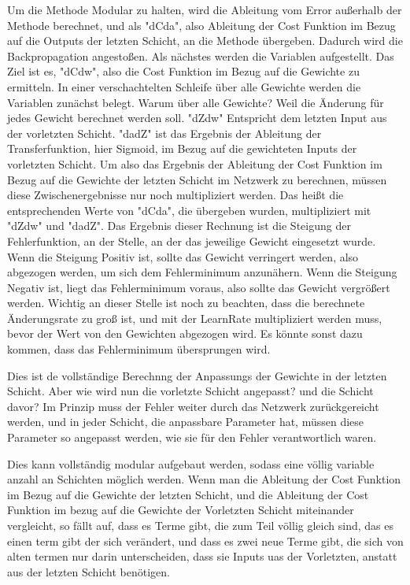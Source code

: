 \documentclass[12pt]{article}
\begin{document}
Um die Methode Modular zu halten, wird die Ableitung vom Error außerhalb der Methode berechnet, und als "dCda", also Ableitung der Cost Funktion im Bezug auf die Outputs der letzten Schicht, an die Methode übergeben. Dadurch wird die Backpropagation angestoßen. Als nächstes werden die Variablen aufgestellt. Das Ziel ist es, "dCdw", also die Cost Funktion im Bezug auf die Gewichte zu ermitteln. 
In einer verschachtelten Schleife über alle Gewichte werden die Variablen zunächst belegt.
Warum über alle Gewichte? Weil die Änderung für jedes Gewicht berechnet werden soll. 
"dZdw" Entspricht dem letzten Input aus der vorletzten Schicht. "dadZ" ist das Ergebnis der Ableitung der Transferfunktion, hier Sigmoid, im Bezug auf die gewichteten Inputs der vorletzten Schicht.
Um also das Ergebnis der Ableitung der Cost Funktion im Bezug auf die Gewichte der letzten Schicht im Netzwerk zu berechnen, müssen diese Zwischenergebnisse nur noch multipliziert werden. Das heißt die entsprechenden Werte von "dCda", die übergeben wurden, multipliziert mit "dZdw" und "dadZ".
Das Ergebnis dieser Rechnung ist die Steigung der Fehlerfunktion, an der Stelle, an der das jeweilige Gewicht eingesetzt wurde. Wenn die Steigung Positiv ist, sollte das Gewicht verringert werden, also abgezogen werden, um sich dem Fehlerminimum anzunähern.
Wenn die Steigung Negativ ist, liegt das Fehlerminimum voraus, also sollte das Gewicht vergrößert werden.
Wichtig an dieser Stelle ist noch zu beachten, dass die berechnete Änderungsrate zu groß ist, und mit der LearnRate multipliziert werden muss, bevor der Wert von den Gewichten abgezogen wird. Es könnte sonst dazu kommen, dass das Fehlerminimum übersprungen wird.

Dies ist de vollständige Berechnng der Anpassungs der Gewichte in der letzten Schicht. Aber wie wird nun die vorletzte Schicht angepasst? und die Schicht davor?
Im Prinzip muss der Fehler weiter durch das Netzwerk zurückgereicht werden, und in jeder Schicht, die anpassbare Parameter hat, müssen diese Parameter so angepasst werden, wie sie für den Fehler verantwortlich waren.

Dies kann vollständig modular aufgebaut werden, sodass eine völlig variable anzahl an Schichten möglich werden. Wenn man die Ableitung der Cost Funktion im Bezug auf die Gewichte der letzten Schicht, und die Ableitung der Cost Funktion im bezug auf die Gewichte der Vorletzten Schicht miteinander vergleicht, so fällt auf, dass es Terme gibt, die zum Teil völlig gleich sind, das es einen term gibt der sich verändert, und dass es zwei neue Terme gibt, die sich von alten termen nur darin unterscheiden, dass sie Inputs uas der Vorletzten, anstatt aus der letzten Schicht benötigen.
\end{document}
